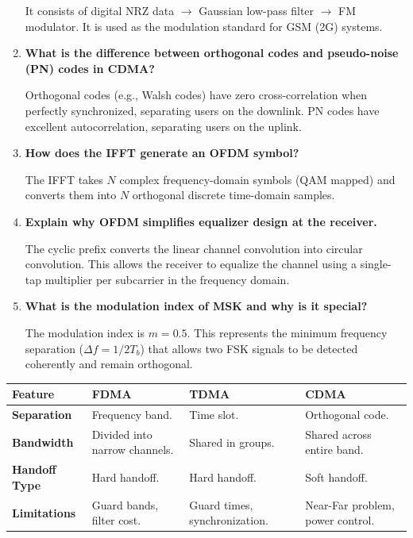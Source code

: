 \documentclass[12pt,a4paper]{article}
\newcommand{\Q}[1]{\textbf{#1}\par\noindent\ignorespaces}
\renewcommand{\arraystretch}{1.45}
\begin{document}
\begin{tcolorbox}[exambox, title={\textbf{Frequently Asked / Viva Questions}}]
\begin{enumerate}[topsep=0pt, label=\textbf{Q\arabic*.}, itemsep=5pt]
    It consists of digital NRZ data $\to$ Gaussian low-pass filter $\to$ FM modulator. It is used as the modulation standard for GSM (2G) systems.
  \item \Q{What is the difference between orthogonal codes and pseudo-noise (PN) codes in CDMA?}
    Orthogonal codes (e.g., Walsh codes) have zero cross-correlation when perfectly synchronized, separating users on the downlink. PN codes have excellent autocorrelation, separating users on the uplink.
  \item \Q{How does the IFFT generate an OFDM symbol?}
    The IFFT takes $N$ complex frequency-domain symbols (QAM mapped) and converts them into $N$ orthogonal discrete time-domain samples.
  \item \Q{Explain why OFDM simplifies equalizer design at the receiver.}
    The cyclic prefix converts the linear channel convolution into circular convolution. This allows the receiver to equalize the channel using a single-tap multiplier per subcarrier in the frequency domain.
  \item \Q{What is the modulation index of MSK and why is it special?}
    The modulation index is $m = 0.5$. This represents the minimum frequency separation ($\Delta f = 1/2T_b$) that allows two FSK signals to be detected coherently and remain orthogonal.
\end{enumerate}
\end{tcolorbox}

\begin{tcolorbox}[tikzbox, title={Comparison of Multiple Access Schemes}]
\renewcommand{\arraystretch}{1.4}
\par\noindent
{\renewcommand{\arraystretch}{1.55}%
\begin{tabularx}{\linewidth}{|B{2.8cm}|Y|Y|Y|}\hline
\textbf{Feature} & \textbf{FDMA} & \textbf{TDMA} & \textbf{CDMA} \\
\hline
\textbf{Separation} & Frequency band. & Time slot. & Orthogonal code. \\
\hline
\textbf{Bandwidth} & Divided into narrow channels. & Shared in groups. & Shared across entire band. \\[4pt]
\hline
\textbf{Handoff Type} & Hard handoff. & Hard handoff. & Soft handoff. \\
\hline
\textbf{Limitations} & Guard bands, filter cost. & Guard times, synchronization. & Near-Far problem, power control. \\[4pt]
\hline
\end{tabularx}
}
\end{tcolorbox}
\end{document}
